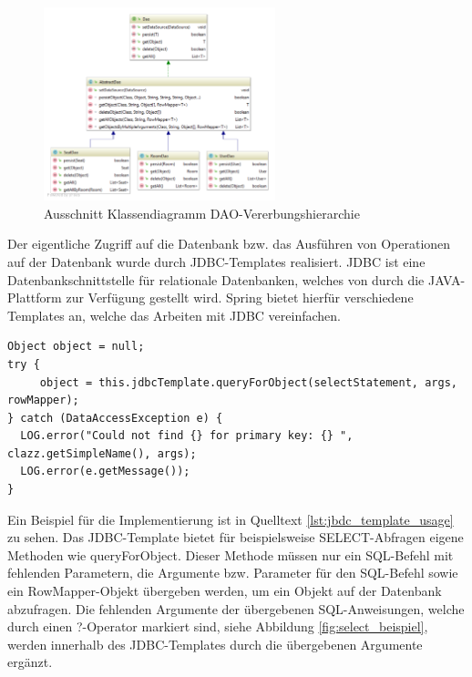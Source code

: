 	\begin{figure}[H]
		\centering 
		\includegraphics[width=0.6\textwidth]{img/dao_klassendia}
		\captionsetup{format=hang}
		\caption[Ausschnitt Klassendiagram DAO-Vererbungshierarchie]{\label{fig:dao_klassendia}Ausschnitt Klassendiagramm \ac{DAO}-Vererbungshierarchie}
	\end{figure}

	Der eigentliche Zugriff auf die Datenbank bzw. das Ausführen von Operationen auf der Datenbank wurde durch \ac{JDBC}-Templates realisiert. \ac{JDBC} ist eine Datenbankschnittstelle für relationale Datenbanken, welches von durch die JAVA-Plattform zur Verfügung gestellt wird. \autocite{WikimediaFoundationInc.2019c} Spring bietet hierfür verschiedene Templates an, welche das Arbeiten mit JDBC vereinfachen.\autocite{PivotalSoftwareInc.b} 
	
\lstset{language=Java}
\begin{lstlisting}[caption={Beispiel JDBC-Template-Verwendung}, label={lst:jbdc_template_usage}]
Object object = null;
try {
     object = this.jdbcTemplate.queryForObject(selectStatement, args, rowMapper);
} catch (DataAccessException e) {
  LOG.error("Could not find {} for primary key: {} ", clazz.getSimpleName(), args);
  LOG.error(e.getMessage());
}
\end{lstlisting}	
	

	Ein Beispiel für die Implementierung ist in Quelltext \ref{lst:jbdc_template_usage} zu sehen. Das \ac{JDBC}-Template bietet für beispielsweise \glqq SELECT\grqq-Abfragen eigene Methoden wie \grqq queryForObject\grqq. Dieser Methode müssen nur ein SQL-Befehl mit fehlenden Parametern, die Argumente bzw. Parameter für den SQL-Befehl sowie ein \glqq RowMapper\grqq-Objekt übergeben werden, um ein Objekt auf der Datenbank abzufragen. Die fehlenden Argumente der übergebenen SQL-Anweisungen, welche durch einen ?-Operator markiert sind, siehe Abbildung \ref{fig:select_beispiel}, werden innerhalb des \ac{JDBC}-Templates durch die übergebenen Argumente ergänzt. 

